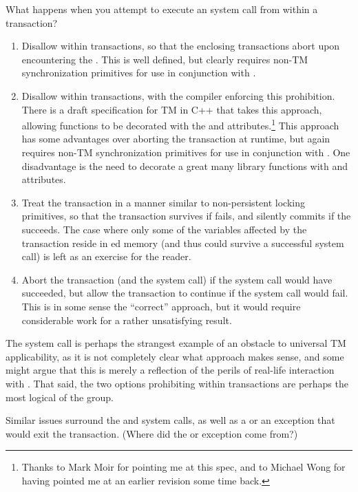 What happens when you attempt to execute an  system call
from within a transaction?

\begin{enumerate}
\item	Disallow  within transactions, so that the enclosing
	transactions abort upon encountering the .
	This is well defined, but clearly requires non-TM synchronization
	primitives for use in conjunction with .
\item	Disallow  within transactions, with the compiler
	enforcing this prohibition.
	There is a draft specification for TM in C++ that takes
	this approach, allowing functions to be decorated with
	the  and 
	attributes.\footnote{
		Thanks to Mark Moir for pointing me at this spec, and
		to Michael Wong for having pointed me at an earlier
		revision some time back.}
	This approach has some advantages over aborting the transaction
	at runtime, but again requires non-TM synchronization primitives
	for use in conjunction with .
	One disadvantage is the need to decorate a great many library
	functions with  and 
	attributes.
\item	Treat the transaction in a manner similar to non-persistent
	locking primitives, so that the transaction survives if 
	fails, and silently commits if the  succeeds.
	The case where only some of the variables affected by the
	transaction reside in ed memory (and thus could
	survive a successful  system call) is left as an
	exercise for the reader.
\item	Abort the transaction (and the  system call) if the
	 system call would have succeeded, but allow the
	transaction to continue if the  system call would
	fail.
	This is in some sense the ``correct'' approach, but it would
	require considerable work for a rather unsatisfying result.
\end{enumerate}

The  system call is perhaps the strangest example of an
obstacle to universal TM applicability, as it is not completely clear
what approach makes sense, and some might argue that this is merely a
reflection of the perils of real-life interaction with .
That said, the two options prohibiting  within transactions
are perhaps the most logical of the group.

Similar issues surround the  and  system calls,
as well as a  or an exception that would exit the transaction.
(Where did the  or exception come from?)

